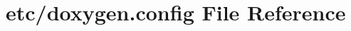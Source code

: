 \hypertarget{doxygen_8config}{\section{etc/doxygen.config File Reference}
\label{doxygen_8config}
}
